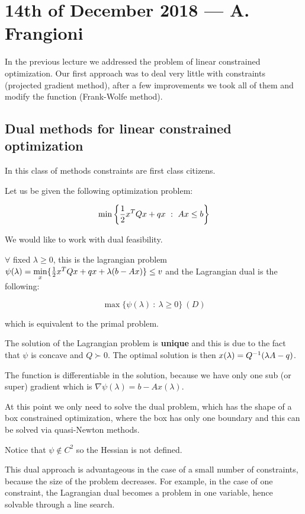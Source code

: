\documentclass[ComputationalMathematics.tex]{subfiles}
\begin{document}
\section{14th of December 2018 --- A. Frangioni}

In the previous lecture we addressed the problem of linear constrained optimization.
Our first approach was to deal very little with constraints (projected gradient method), after a few improvements we took all of them and modify the function (Frank-Wolfe method).

\subsection{Dual methods for linear constrained optimization}
In this class of methods constraints are first class citizens.

Let us be given the following optimization problem:

\[
  \min \bigg \{\frac{1}{2} {x}^{T} Q x + q x~:~Ax \leq b \bigg \}
\]

We would like to work with dual feasibility.

$\forall$ fixed $\lambda \geq 0$, this is the lagrangian problem $\psi(\lambda) = \min\limits_x \{\frac{1}{2} {x}^{T} Q x + q x + \lambda (b - Ax)\} \leq v$ and the Lagrangian dual is the following:

\[
  \max \{\psi(\lambda)~:~\lambda \geq 0\}~(D)
\]

which is equivalent to the primal problem.

The solution of the Lagrangian problem is \textbf{unique} and this is due to the fact that $\psi$ is concave  and $Q \succ 0$. The optimal solution is then $x(\lambda) = {Q}^{-1}(\lambda A - q)$.

The function is differentiable in the solution, because we have only one sub (or super) gradient which is $\nabla \psi(\lambda) = b - Ax(\lambda)$.

At this point we only need to solve the dual problem, which has the shape of a box constrained optimization, where the box has only one boundary and this can be solved via quasi-Newton methods.

Notice that $\psi \notin C^2$ so the Hessian is not defined.

This dual approach is advantageous in the case of a small number of constraints, because the size of the problem decreases.
For example, in the case of one constraint, the Lagrangian dual becomes a problem in one variable, hence solvable through a line search.
\end{document}
